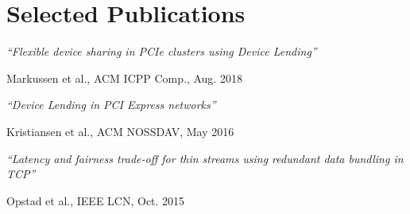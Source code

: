 \section{Selected Publications}
\small{%
\parbox[t][][t]{\linewidth}{
	\parbox{\linewidth}{\textit{``Flexible device sharing in PCIe clusters using Device Lending''}}
	\smallbreak
	\parbox{\linewidth}{{Markussen et al.}, {ACM ICPP Comp., Aug. 2018}}
	\bigbreak
}

\parbox[t][][t]{\linewidth}{
	\parbox{\linewidth}{\textit{``Device Lending in PCI Express networks''}}
	\smallbreak
	\parbox{\linewidth}{{Kristiansen et al.}, {ACM NOSSDAV, May 2016}}
	\bigbreak
}

\parbox[t][][t]{\linewidth}{
	\parbox{\linewidth}{\textit{``Latency and fairness trade-off for thin streams using redundant data
	bundling in TCP''}}
	\smallbreak
	\parbox{\linewidth}{{Opstad et al.}, {IEEE LCN, Oct. 2015}}
}

}

